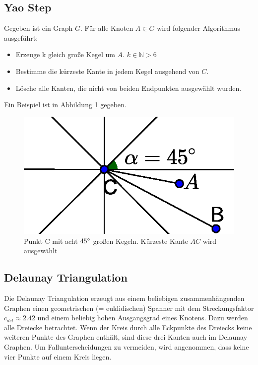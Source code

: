 \documentclass[a4paper,twoside]{IEEEtran}
\begin{document}
\subsection{Yao Step}
Gegeben ist ein Graph $G $. Für alle Knoten $A \in G $ wird folgender Algorithmus ausgeführt:
\begin{itemize}
\item Erzeuge k gleich große Kegel um $A $. $k \in \mathds{N} > 6 $
\item Bestimme die kürzeste Kante in jedem Kegel ausgehend von $C $.
\item Lösche alle Kanten, die nicht von beiden Endpunkten ausgewählt wurden.
\end{itemize}
Ein Beispiel ist in Abbildung \ref{fig:YaoStep2} gegeben.

\begin{figure}
\centering
\includegraphics[width=0.99\linewidth]{Yao_Step2.eps}
\caption{Punkt C mit acht $45\degree $ großen Kegeln. Kürzeste Kante $AC $ wird ausgewählt}
\label{fig:YaoStep2}
\end{figure}



\subsection{Delaunay Triangulation}
Die Delaunay Triangulation erzeugt aus einem beliebigen zusammenhängenden Graphen einen geometrischen (= euklidischen) Spanner mit dem Streckungsfaktor $c_{del} \approx 2.42 $ und einem beliebig hohen Ausgangsgrad eines Knotens. 
Dazu werden alle Dreiecke betrachtet.
Wenn der Kreis durch alle Eckpunkte des Dreiecks keine weiteren Punkte des Graphen enthält, sind diese drei Kanten auch im Delaunay Graphen. 
Um Fallunterscheidungen zu vermeiden, wird angenommen, dass keine vier Punkte auf einem Kreis liegen. 
\end{document}
